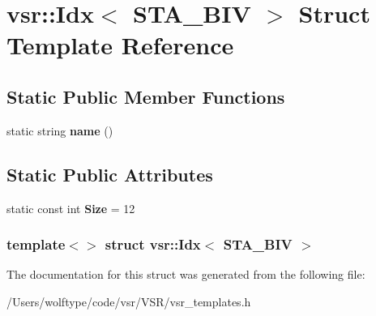 \hypertarget{structvsr_1_1_idx_3_01_s_t_a___b_i_v_01_4}{\section{vsr\-:\-:Idx$<$ S\-T\-A\-\_\-\-B\-I\-V $>$ Struct Template Reference}
\label{structvsr_1_1_idx_3_01_s_t_a___b_i_v_01_4}
}
\subsection*{Static Public Member Functions}
\begin{DoxyCompactItemize}
\item 
\hypertarget{structvsr_1_1_idx_3_01_s_t_a___b_i_v_01_4_ab393bd05b3414d984feea7afca85e770}{static string {\bfseries name} ()}\label{structvsr_1_1_idx_3_01_s_t_a___b_i_v_01_4_ab393bd05b3414d984feea7afca85e770}

\end{DoxyCompactItemize}
\subsection*{Static Public Attributes}
\begin{DoxyCompactItemize}
\item 
\hypertarget{structvsr_1_1_idx_3_01_s_t_a___b_i_v_01_4_a6ec289e9d2221ea47bd78f75a328818a}{static const int {\bfseries Size} = 12}\label{structvsr_1_1_idx_3_01_s_t_a___b_i_v_01_4_a6ec289e9d2221ea47bd78f75a328818a}

\end{DoxyCompactItemize}
\subsubsection*{template$<$$>$ struct vsr\-::\-Idx$<$ S\-T\-A\-\_\-\-B\-I\-V $>$}



The documentation for this struct was generated from the following file\-:\begin{DoxyCompactItemize}
\item 
/\-Users/wolftype/code/vsr/\-V\-S\-R/vsr\-\_\-templates.\-h\end{DoxyCompactItemize}
